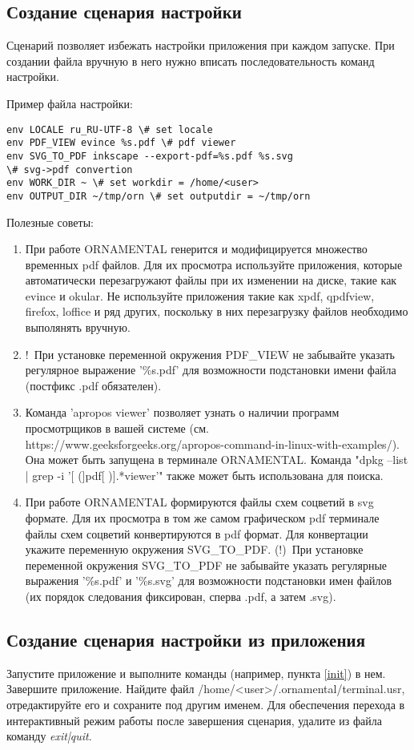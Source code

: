 \documentclass[a4paper]{article}
\begin{document}
\subsection{Создание сценария настройки \label{init}}

Сценарий позволяет избежать настройки приложения при каждом запуске. При создании файла вручную в него нужно вписать последовательность команд настройки. 

Пример файла настройки:
\begin{lstlisting}
env LOCALE ru_RU-UTF-8 \# set locale
env PDF_VIEW evince %s.pdf \# pdf viewer
env SVG_TO_PDF inkscape --export-pdf=%s.pdf %s.svg 
\# svg->pdf convertion
env WORK_DIR ~ \# set workdir = /home/<user>
env OUTPUT_DIR ~/tmp/orn \# set outputdir = ~/tmp/orn
\end{lstlisting}

Полезные советы:
\begin{enumerate}
\item При работе ORNAMENTAL генерится и модифицируется множество временных pdf файлов. Для их просмотра используйте приложения, которые автоматически перезагружают файлы при их изменении на диске, такие как evince и okular. Не используйте приложения такие как xpdf, qpdfview, firefox, loffice и ряд других, поскольку в них перезагрузку файлов необходимо выполянять вручную. 
\item !~При установке переменной окружения PDF\_VIEW не забывайте указать регулярное выражение '\%s.pdf' для возможности подстановки имени файла (постфикс .pdf обязателен).
\item Команда 'apropos viewer' позволяет узнать о наличии программ просмотрщиков в вашей системе (см. https://www.geeksforgeeks.org/apropos-command-in-linux-with-examples/). Она может быть запущена в терминале ORNAMENTAL. Команда
"dpkg --list | grep -i '[ (]pdf[ )].*viewer'" также может быть использована для поиска.
\item При работе ORNAMENTAL формируются файлы схем соцветий в svg формате. Для их просмотра в том же самом графическом pdf терминале файлы схем соцветий конвертируются в pdf формат. Для конвертации укажите переменную окружения SVG\_TO\_PDF. (!)~При установке переменной окружения SVG\_TO\_PDF не забывайте указать регулярные выражения '\%s.pdf' и '\%s.svg' для возможности подстановки имен файлов (их порядок следования фиксирован, сперва .pdf, а затем .svg).
\end{enumerate}

\subsection{Создание сценария настройки из приложения}
Запустите приложение и выполните команды (например, пункта \ref{init}) в нем. Завершите приложение. Найдите файл /home/<user>/.ornamental/terminal.usr, отредактируйте его и сохраните под другим именем. Для обеспечения перехода в интерактивный режим работы после завершения сценария, удалите из файла команду \textit{exit|quit}.
\end{document}
